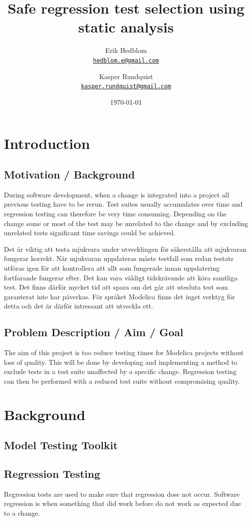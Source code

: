 \documentclass{cslthse-msc}
\author{
	Erik Hedblom \\
	{\normalsize \href{mailto:hedblom.e@gmail.com}{\texttt{hedblom.e@gmail.com}}}
	\and
	Kasper Rundquist \\
	{\normalsize \href{mailto:kasper.rundquist@gmail.com}{\texttt{kasper.rundquist@gmail.com}}}
}
\title{Safe regression test selection using static analysis}
\date{\today}
\begin{document}
\makefrontmatter
\chapter[Introduction]{Introduction}

\section{Motivation / Background}
During software development, when a change is integrated into a project all previous testing have to be rerun. Test suites usually accumulates over time and regression testing can therefore be very time consuming. Depending on the change some or most of the test may be unrelated to the change and by excluding unrelated tests significant time savings could be achieved. ~\cite{DUMMY}


Det är viktig att testa mjukvara under utvecklingen för säkerställa att mjukvaran fungerar korrekt. När mjukvaran uppdateras måste testfall som redan testats utföras igen för att kontrollera att allt som fungerade innan uppdatering fortfarande fungerar efter. Det kan vara väldigt tidskrävande att köra samtliga test. Det finns därför mycket tid att spara om det går att utesluta test som garanterat inte har påverkas. För språket Modelica finns det inget verktyg för detta och det är därför intressant att utveckla ett.

\section{Problem Description / Aim / Goal}

The aim of this project is too reduce testing times for Modelica projects without loss of quality. This will be done by developing and implementing a method to exclude tests in a test suite unaffected by a specific change. Regression testing can then be performed with a reduced test suite without compromising quality. 

\chapter[Background]{Background}

\section{Model Testing Toolkit}
\section{Regression Testing}
Regression tests are used to make sure that regression dose not occur. Software regression is when something that did work before do not work as expected due to a change.
\end{document}
